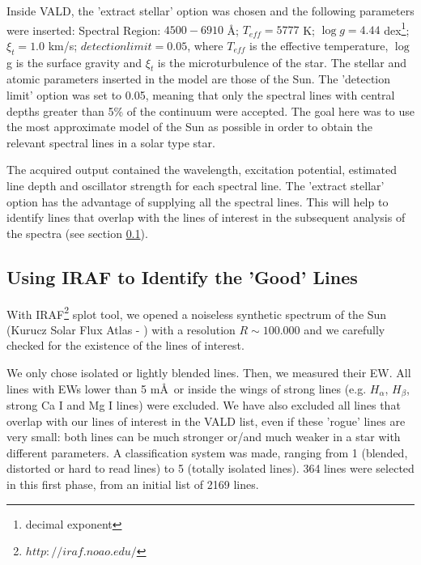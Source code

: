 \documentclass[dvips,12pt,a4paper]{report}
\begin{document}
{Inside VALD, the 'extract stellar' option was chosen and the following parameters were inserted: Spectral Region: $4500-6910$ \AA ; $T_{eff}=5777$ K; $\log g=4.44$ dex\footnote{decimal exponent}; $\xi_t=1.0$ km/s; $detection limit=0.05$, where $T_{eff}$ is the effective temperature, $\log$ g is the surface gravity and $\xi_t$ is the microturbulence of the star. The stellar and atomic parameters inserted in the model are those of the Sun. The 'detection limit' option was set to 0.05, meaning that only the spectral lines with central depths greater than 5\% of the continuum were accepted. The goal here was to use the most approximate model of the Sun as possible in order to obtain the relevant spectral lines in a solar type star. 

The acquired output contained the wavelength, excitation potential, estimated line depth and oscillator strength for each spectral line. The 'extract stellar' option has the advantage of supplying all the spectral lines. This will help to identify lines that overlap with the lines of interest in the subsequent analysis of the spectra (see section \ref{idiraf}).


\subsection {Using IRAF to Identify the 'Good' Lines}
\label{idiraf}
With IRAF\footnote{$http://iraf.noao.edu/$} splot tool, we opened a noiseless synthetic spectrum of the Sun (Kurucz Solar Flux Atlas - \citet{Kurucz-1984} ) with a resolution $R\sim100.000$ and we carefully checked for the existence of the lines of interest.

We only chose isolated or lightly blended lines. Then, we measured their EW. All lines with EWs lower than 5 m\AA\, or inside the wings of strong lines (e.g. $H_\alpha$, $H_\beta$, strong Ca I and Mg I lines) were excluded. We have also excluded all lines that overlap with our lines of interest in the VALD list, even if these 'rogue' lines are very small: both lines can be much stronger or/and much weaker in a star with different parameters. A classification system was made, ranging from 1 (blended, distorted or hard to read lines) to 5 (totally isolated lines). 364 lines were selected in this first phase, from an initial list of 2169 lines. 

}
\end{document}

